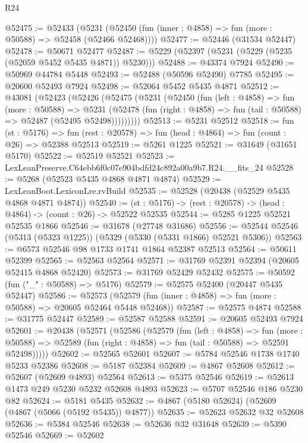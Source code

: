 \begin{lexlean}{R24}
\begin{coremodule}
@52475 := @52433
    (@5231 (@52450 (fun (inner : @4858) => fun (more : @50588) => @52458 (@52466 @52468))))
@52477 := @52446 (@31534 @52447)
@52478 := @50671 @52477
@52487 := @5229 (@52397 (@5231 (@5229 (@5235 (@52059 @5452 @5435 @4871)) @5230)))
@52488 := @43374 @7924
@52490 := @50969 @44784 @5448
@52493 := @52488 (@50596 @52490) @7785
@52495 := @20600 @52493 @7924
@52498 := @52064 @5452 @5435 @4871
@52512 := @43081
    (@52423
      (@52426
        (@52475
          (@5231
            (@52450
              (fun (left : @4858) =>
              fun (more : @50588) =>
              @5231
                (@52478
                  (fun (right : @4858) => fun (tail : @50588) => @52487 (@52495 @52498)))))))))
@52513 := @5231 @52512
@52518 := fun (st : @5176) =>
  fun (rest : @20578) => fun (head : @4864) => fun (count : @26) => @52388 @52513
@52519 := @5261 @1225
@52521 := @31649 (@31651 @5170)
@52522 := @52519 @52521
@52523 := LexLeanPreserve.C64ebb6f0c07e904bdfd24c892a00a9b7.R24.__fits_24
@52528 := @5268 (@52523 @5435 @4868 @4871 @4874)
@52529 := LexLeanBoot.LexiconLre.rvBuild
@52535 := @52528 (@20438 (@52529 @5435 @4868 @4871 @4874))
@52540 := (st : @5176) -> (rest : @20578) -> (head : @4864) -> (count : @26) -> @52522 @52535
@52544 := @5285 @1225 @52521 @52535 @1866
@52546 := @31678 (@27748 @31686)
@52556 := @52544 @52546 (@5313 (@5323 @1225)) (@5329 (@5330 (@5331 @1866) @52521 @5306))
@52563 := @6573 @52546 @98 @1733 @1741 @1864 @52387 @52513
@52564 := @50611 @52399
@52565 := @52563 @52564
@52571 := @31769 @52391 @52394 (@20605 @52415 @4868 @52420)
@52573 := @31769 @52429 @52432
@52575 := @50592 (fun ("_" : @50588) => @5176)
@52579 := @52575 @52400 (@20447 @5435 @52447)
@52586 := @52573 (@52579 (fun (inner : @4858) => fun (more : @50588) => @20605 @52464 @5448 @52468))
@52587 := @52575 @4874
@52588 := @31775 @52447
@52589 := @52587 @52588
@52591 := @20605 @52493 @7924
@52601 := @20438
    (@52571
      (@52586
        (@52579
          (fun (left : @4858) =>
          fun (more : @50588) =>
          @52589 (fun (right : @4858) => fun (tail : @50588) => @52591 @52498)))))
@52602 := @52565 @52601
@52607 := @5784 @52546 @1738 @1740 @5233 @52386
@52608 := @5187 @52384
@52609 := @4867 @52608
@52612 := @52607 (@52609 @4893) @52564
@52613 := @5375 @52546
@52619 := @52613 @1473 @249 @5230 @5232 @52608 @4893
@52623 := @5707 @52546 @186 @5230 @82
@52624 := @5181 @5435
@52632 := @4867 (@5180 @52624) (@52609 (@4867 (@5066 (@5192 @5435)) @4877))
@52635 := @52623 @52632 @32 @52608
@52636 := @5384 @52546
@52638 := @52636 @32 @31648
@52639 := @5390 @52546
@52669 := @52602

\end{coremodule}
\end{lexlean}
